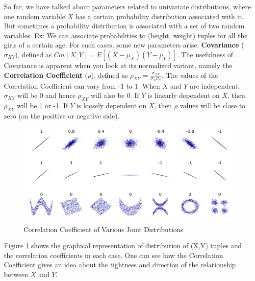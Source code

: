 So far, we have talked about parameters related to univariate distributions, where one random variable $X$ has a certain probability distribution associated with it. But sometimes a probability distribution is associated with a set of two random variables. Ex: We can associate probabilities to (height, weight) tuples for all the girls of a certain age. For such cases, some new parameters arise. \textbf{Covariance} ($\sigma_{XY}$), defined as \( Cov[X,Y] = E[(X-\mu_X)(Y-\mu_Y)] \). The usefulness of Covariance is apparent when you look at its normalized variant, namely the \textbf{Correlation Coefficient} ($\rho$), defined as \( \rho_{XY} = \frac{\sigma_{XY}}{\sigma_X \sigma_Y}\). The values of the Correlation Coefficient can vary from -1 to 1. When $X$ and $Y$ are independent, $\sigma_{XY}$ will be 0 and hence $\rho_{XY}$ will also be 0. If $Y$ is linearly dependent on $X$, then $\rho_{XY}$ will be 1 or -1. If $Y$ is loosely dependent on $X$, then $\rho$ values will be close to zero (on the positive or negative side). 
	\begin{figure}
	  \centering
	    \includegraphics[width=\textwidth]{Statistics/correlation}
	  \caption{Correlation Coefficient of Various Joint Distributions}
	  \label{fig:correlation}
	\end{figure}

Figure \ref{fig:correlation} shows the graphical representation of distribution of (X,Y) tuples and the correlation coefficients in each case. One can see how the Correlation Coefficient gives an idea about the tightness and direction of the relationship between $X$ and $Y$.


